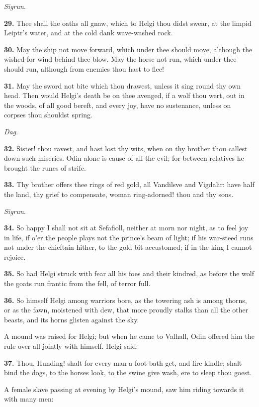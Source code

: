 \emph{Sigrun}.

\textbf{29.} Thee shall the oaths all gnaw, which to Helgi thou didst swear,
at the limpid Leiptr's water, and at the cold dank wave-washed rock.

\textbf{30.} May the ship not move forward, which under thee should move,
although the wished-for wind behind thee blow. May the horse not run,
which under thee should run, although from enemies thou hast to flee!

\textbf{31.} May the sword not bite which thou drawest, unless it sing round
thy own head. Then would Helgi's death be on thee avenged, if a wolf
thou wert, out in the woods, of all good bereft, and every joy, have
no sustenance, unless on corpses thou shouldst spring.

\emph{Dag}.

\textbf{32.} Sister! thou ravest, and hast lost thy wits, when on thy brother
thou callest down such miseries. Odin alone is cause of all the evil;
for between relatives he brought the runes of strife.

\textbf{33.} Thy brother offers thee rings of red gold, all Vandilsve and
Vigdalir: have half the land, thy grief to compensate, woman
ring-adorned! thou and thy sons.

\emph{Sigrun}.

\textbf{34.} So happy I shall not sit at Sefafioll, neither at morn nor
night, as to feel joy in life, if o'er the people plays not the
prince's beam of light; if his war-steed runs not under the chieftain
hither, to the gold bit accustomed; if in the king I cannot rejoice.

\textbf{35.} So had Helgi struck with fear all his foes and their kindred, as
before the wolf the goats run frantic from the fell, of terror full.

\textbf{36.} So himself Helgi among warriors bore, as the towering ash is
among thorns, or as the fawn, moistened with dew, that more proudly
stalks than all the other beasts, and its horns glisten against the
sky.

A mound was raised for Helgi; but when he came to Valhall, Odin
offered him the rule over all jointly with himself. Helgi said:

\textbf{37.} Thou, Hunding! shalt for every man a foot-bath get, and fire
kindle; shalt bind the dogs, to the horses look, to the swine give
wash, ere to sleep thou goest.

A female slave passing at evening by Helgi's mound, saw him riding
towards it with many men:

